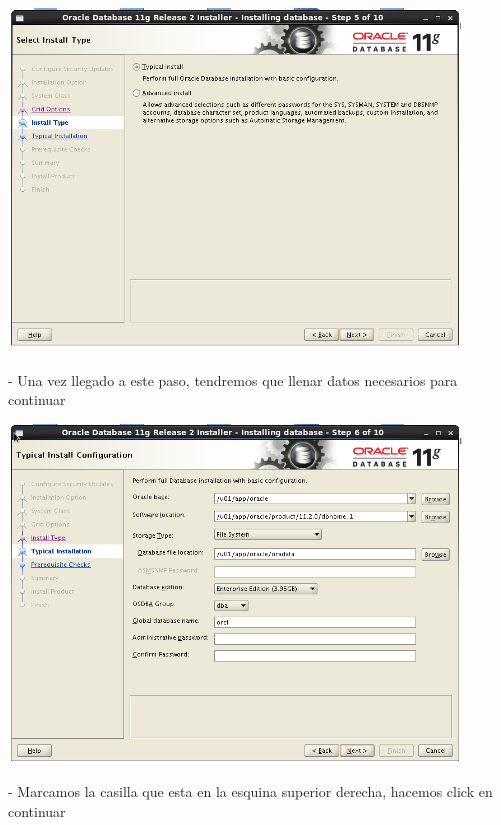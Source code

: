 \documentclass[12pt,letterpaper]{article}
\begin{document}
\begin{center}
	\includegraphics[width=12cm]{./Imagenes/30} 
\end{center}


\begin{itemize}
- Una vez llegado a este paso, tendremos que llenar datos necesarios para continuar \\
\end{itemize}

\begin{center}
	\includegraphics[width=12cm]{./Imagenes/31} 
\end{center}

\begin{itemize}
- Marcamos la casilla que esta en la esquina superior derecha, hacemos click en continuar \\
\end{itemize}
\end{document}
